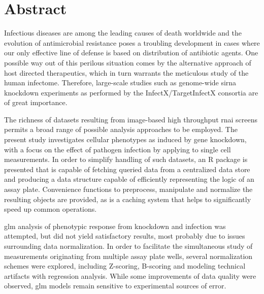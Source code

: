 \chapter{Abstract}

Infectious diseases are among the leading causes of death worldwide and the evolution of antimicrobial resistance poses a troubling development in cases where our only effective line of defense is based on distribution of antibiotic agents. One possible way out of this perilous situation comes by the alternative approach of host directed therapeutics, which in turn warrants the meticulous study of the human infectome. Therefore, large-scale studies such as genome-wide \acrshort{sirna} knockdown experiments as performed by the InfectX/TargetInfectX consortia are of great importance.

The richness of datasets resulting from image-based high throughput \acrshort{rnai} screens permits a broad range of possible analysis approaches to be employed. The present study investigates cellular phenotypes as induced by gene knockdown, with a focus on the effect of pathogen infection by applying  to single cell measurements. In order to simplify handling of such datasets, an R package is presented that is capable of fetching queried data from a centralized data store and producing a data structure capable of efficiently representing the logic of an assay plate. Convenience functions to preprocess, manipulate and normalize the resulting objects are provided, as is a caching system that helps to significantly speed up common operations.

\acrshort{glm} analysis of phenotypic response from knockdown and infection was attempted, but did not yield satisfactory results, most probably due to issues surrounding data normalization. In order to facilitate the simultaneous study of measurements originating from multiple assay plate wells, several normalization schemes were explored, including Z-scoring, B-scoring and modeling technical artifacts with  regression analysis. While some improvements of data quality were observed, \acrshort{glm} models remain sensitive to experimental sources of error.